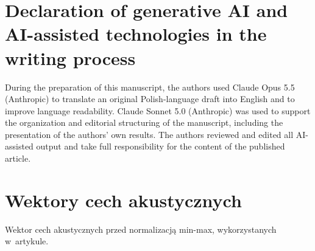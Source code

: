 \documentclass{article}
\begin{document}

\section*{Declaration of generative AI and AI-assisted technologies
in the writing process}

During the preparation of this manuscript, the authors used Claude
Opus 5.5 (Anthropic) to translate an original Polish-language draft
into English and to improve language readability. Claude Sonnet 5.0
(Anthropic) was used to support the organization and editorial
structuring of the manuscript, including the presentation of the
authors' own results. The authors reviewed and edited all AI-assisted
output and take full responsibility for the content of the published
article.

\clearpage



\clearpage
\appendix
\section{Wektory cech akustycznych}


Wektor cech akustycznych przed normalizacją min-max, wykorzystanych w~artykule.
\end{document}
